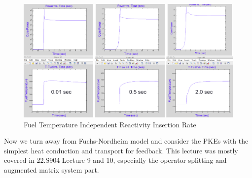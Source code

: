 \documentclass{school-22.211-notes}
\begin{document}
  \begin{figure}[ht] 
    \centering
    \includegraphics[width=7in]{images/pke/fn2.png}
    \caption{Fuel Temperature Independent Reactivity Insertion Rate} \label{fn2}
  \end{figure}




\clearpage
{}
Now we turn away from Fuchs-Nordheim model and consider the PKEs with the simplest heat conduction and transport for feedback. This lecture was mostly covered in 22.S904 Lecture 9 and 10, especially the operator splitting and augmented matrix system part. 
\end{document}
